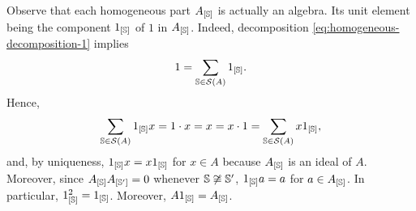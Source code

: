 \begin{rem}\label{rem:homogeneus-part-is-algebra}
    Observe that each homogeneous part $A_{[\mathbb S]}$ is actually an algebra. Its unit element being the component $1_{[\mathbb S]}$ of $1$ in $A_{[\mathbb S]}$. Indeed, decomposition \eqref{eq:homogeneous-decomposition-1} implies
    $$
        1 = \sum_{\mathbb S\in\mathcal S(A)} 1_{[\mathbb S]}.
    $$
    Hence,
    $$
        \sum_{\mathbb S\in\mathcal S(A)} 1_{[\mathbb S]}x
        = 1\cdot x=x=x\cdot1
        = \sum_{\mathbb S\in\mathcal S(A)} x1_{[\mathbb S]},
    $$
    and, by uniqueness, $1_{[\mathbb S]}x=x1_{[\mathbb S]}$ for $x\in A$ because $A_{[\mathbb S]}$ is an ideal of $A$. Moreover, since $A_{[\mathbb S]}A_{[\mathbb S']}=0$ whenever $\mathbb S\not\cong\mathbb S'$, $1_{[\mathbb S]}a=a$ for $a\in A_{[\mathbb S]}$. In particular, $1_{[\mathbb S]}^2=1_{[\mathbb S]}$. Moreover, $A1_{[\mathbb S]}=A_{[\mathbb S]}$.
\end{rem}

